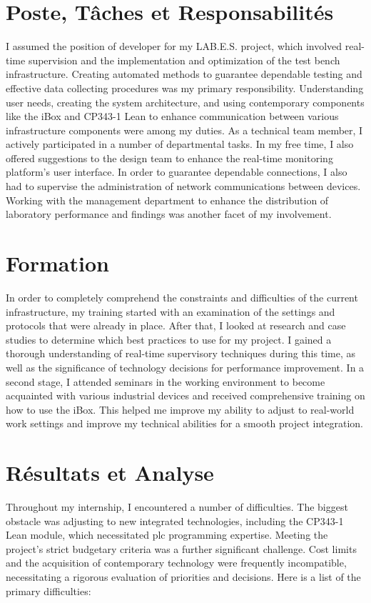 

\section{Poste, Tâches et Responsabilités}
I assumed the position of developer for my LAB.E.S. project, which involved real-time supervision and the implementation and optimization of the test bench infrastructure. Creating automated methods to guarantee dependable testing and effective data collecting procedures was my primary responsibility. Understanding user needs, creating the system architecture, and using contemporary components like the iBox and CP343-1 Lean to enhance communication between various infrastructure components were among my duties.
As a technical team member, I actively participated in a number of departmental tasks. In my free time, I also offered suggestions to the design team to enhance the real-time monitoring platform's user interface. In order to guarantee dependable connections, I also had to supervise the administration of network communications between devices.
Working with the management department to enhance the distribution of laboratory performance and findings was another facet of my involvement.


\section{Formation}
In order to completely comprehend the constraints and difficulties of the current infrastructure, my training started with an examination of the settings and protocols that were already in place. After that, I looked at research and case studies to determine which best practices to use for my project. I gained a thorough understanding of real-time supervisory techniques during this time, as well as the significance of technology decisions for performance improvement.
In a second stage, I attended seminars in the working environment to become acquainted with various industrial devices and received comprehensive training on how to use the iBox. This helped me improve my ability to adjust to real-world work settings and improve my technical abilities for a smooth project integration.

\section{Résultats et Analyse}
Throughout my internship, I encountered a number of difficulties. The biggest obstacle was adjusting to new integrated technologies, including the CP343-1 Lean module, which necessitated plc programming expertise.
Meeting the project's strict budgetary criteria was a further significant challenge. Cost limits and the acquisition of contemporary technology were frequently incompatible, necessitating a rigorous evaluation of priorities and decisions.
Here is a list of the primary difficulties:

